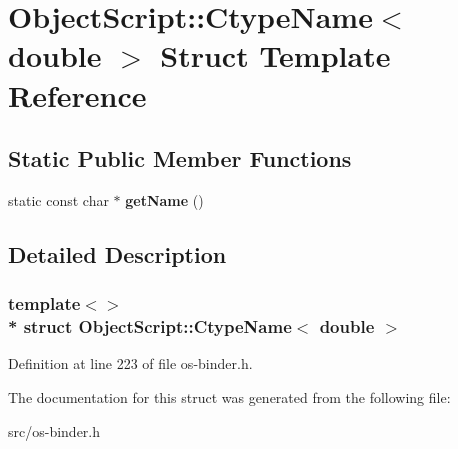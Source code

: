 \hypertarget{struct_object_script_1_1_ctype_name_3_01double_01_4}{}\section{Object\+Script\+:\+:Ctype\+Name$<$ double $>$ Struct Template Reference}
\label{struct_object_script_1_1_ctype_name_3_01double_01_4}
\subsection*{Static Public Member Functions}
\begin{DoxyCompactItemize}
\item 
static const char $\ast$ {\bfseries get\+Name} ()\hypertarget{struct_object_script_1_1_ctype_name_3_01double_01_4_a5052205136008270c7cb47211b311533}{}\label{struct_object_script_1_1_ctype_name_3_01double_01_4_a5052205136008270c7cb47211b311533}

\end{DoxyCompactItemize}


\subsection{Detailed Description}
\subsubsection*{template$<$$>$\\*
struct Object\+Script\+::\+Ctype\+Name$<$ double $>$}



Definition at line 223 of file os-\/binder.\+h.



The documentation for this struct was generated from the following file\+:\begin{DoxyCompactItemize}
\item 
src/os-\/binder.\+h\end{DoxyCompactItemize}

